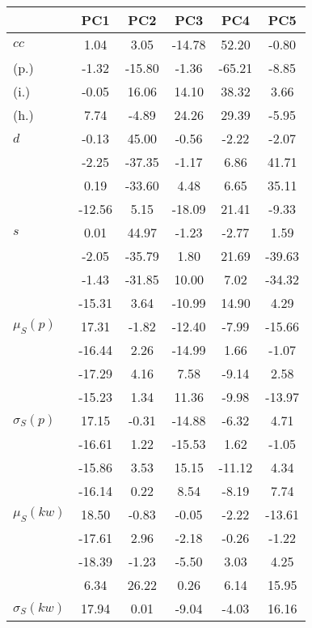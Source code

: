\begin{table}[h!]
\begin{center}
\begin{tabular}{| l | c | c | c | c | c |}\hline
 & PC1 & PC2 & PC3 & PC4 & PC5 \\\hline
$cc$ & 1.04  & 3.05  & -14.78  & 52.20  & -0.80 \\\hline
(p.) & -1.32  & -15.80  & -1.36  & -65.21  & -8.85 \\\hline
(i.) & -0.05  & 16.06  & 14.10  & 38.32  & 3.66 \\\hline
(h.) & 7.74  & -4.89  & 24.26  & 29.39  & -5.95 \\\hline
$d$ & -0.13  & 45.00  & -0.56  & -2.22  & -2.07 \\\hline
 & -2.25  & -37.35  & -1.17  & 6.86  & 41.71 \\\hline
 & 0.19  & -33.60  & 4.48  & 6.65  & 35.11 \\\hline
 & -12.56  & 5.15  & -18.09  & 21.41  & -9.33 \\\hline
$s$ & 0.01  & 44.97  & -1.23  & -2.77  & 1.59 \\\hline
 & -2.05  & -35.79  & 1.80  & 21.69  & -39.63 \\\hline
 & -1.43  & -31.85  & 10.00  & 7.02  & -34.32 \\\hline
 & -15.31  & 3.64  & -10.99  & 14.90  & 4.29 \\\hline
$\mu_S(p)$ & 17.31  & -1.82  & -12.40  & -7.99  & -15.66 \\\hline
 & -16.44  & 2.26  & -14.99  & 1.66  & -1.07 \\\hline
 & -17.29  & 4.16  & 7.58  & -9.14  & 2.58 \\\hline
 & -15.23  & 1.34  & 11.36  & -9.98  & -13.97 \\\hline
$\sigma_S(p)$ & 17.15  & -0.31  & -14.88  & -6.32  & 4.71 \\\hline
 & -16.61  & 1.22  & -15.53  & 1.62  & -1.05 \\\hline
 & -15.86  & 3.53  & 15.15  & -11.12  & 4.34 \\\hline
 & -16.14  & 0.22  & 8.54  & -8.19  & 7.74 \\\hline
$\mu_S(kw)$ & 18.50  & -0.83  & -0.05  & -2.22  & -13.61 \\\hline
 & -17.61  & 2.96  & -2.18  & -0.26  & -1.22 \\\hline
 & -18.39  & -1.23  & -5.50  & 3.03  & 4.25 \\\hline
 & 6.34  & 26.22  & 0.26  & 6.14  & 15.95 \\\hline
$\sigma_S(kw)$ & 17.94  & 0.01  & -9.04  & -4.03  & 16.16 \\\hline

\end{tabular}
\end{center}
\end{table}
